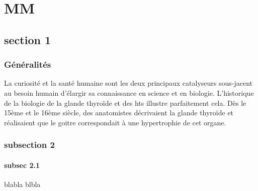 \documentclass[../main.tex]{subfiles}
\begin{document}
\chapter{MM}


\section{section 1}



\subsection{Généralités}

La curiosité et la santé humaine sont les deux principaux catalyseurs sous-jacent au besoin humain d'élargir sa connaissance en science et en biologie.
L'historique de la biologie de la glande thyroïde et des \glspl{ht} illustre parfaitement cela.
Dès le 15ème et le 16ème siècle, des anatomistes décrivaient la glande thyroïde et réalisaient que le goitre correspondait à une hypertrophie de cet organe.




\subsection{subsection 2}


\subsubsection{subsec 2.1}

blabla
blbla
\end{document}
